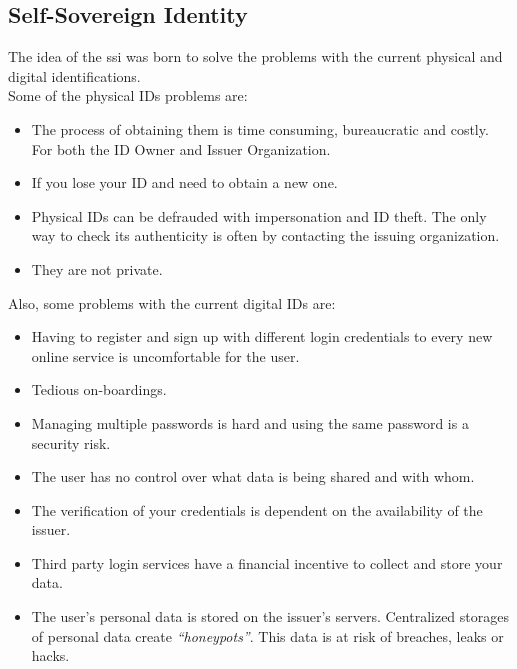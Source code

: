 \documentclass[a4paper, 12pt]{article} %
\begin{document}
        
        \subsection{Self-Sovereign Identity}
            The idea of the \acrlong{ssi} was born to solve the problems with the current physical and digital identifications.\\
            Some of the physical IDs problems are:
            \begin{itemize}
                \item The process of obtaining them is time consuming, bureaucratic and costly. For both the ID Owner and Issuer Organization. 
                \item If you lose your ID and need to obtain a new one.
                \item Physical IDs can be defrauded with impersonation and ID theft. The only way to check its authenticity is often by contacting the issuing organization.
                \item They are not private.
            \end{itemize}
            Also, some problems with the current digital IDs are:
            \begin{itemize}
                \item Having to register and sign up with different login credentials to every new online service is uncomfortable for the user. 
                \item Tedious on-boardings.
                \item Managing multiple passwords is hard and using the same password is a security risk.
                \item The user has no control over what data is being shared and with whom.
                \item The verification of your credentials is dependent on the availability of the issuer.
                \item Third party login services have a financial incentive to collect and store your data.
                \item The user's personal data is stored on the issuer’s servers. Centralized storages of personal data create \textit{“honeypots”}. This data is at risk of breaches, leaks or hacks.
            \end{itemize}
\end{document}
